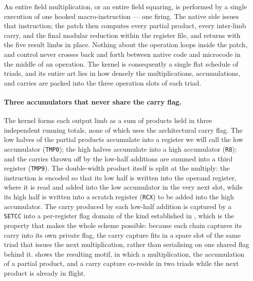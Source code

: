 An entire field multiplication, or an entire field squaring, is performed by a
single execution of one hooked macro-instruction --- one firing. The native side
issues that instruction; the patch then computes every partial product, every
inter-limb carry, and the final modular reduction within the register file, and
returns with the five result limbs in place. Nothing about the operation loops
inside the patch, and control never crosses back and forth between native code
and microcode in the middle of an operation. The kernel is consequently a single
flat schedule of triads, and its entire art lies in how densely the
multiplications, accumulations, and carries are packed into the three operation
slots of each triad.

\paragraph{Three accumulators that never share the carry flag.}
The kernel forms each output limb as a sum of products held in three independent
running totals, none of which uses the architectural carry flag. The low halves
of the partial products accumulate into a register we will call the low
accumulator (\texttt{TMP0}); the high halves accumulate into a high accumulator
(\texttt{R8}); and the carries thrown off by the low-half additions are summed
into a third register (\texttt{TMP9}). The double-width product itself is split
at the multiply: the instruction is encoded so that its low half is written into
the operand register, where it is read and added into the low accumulator in the
very next slot, while its high half is written into a scratch register
(\texttt{RCX}) to be added into the high accumulator. The carry produced by each
low-half addition is captured by a \texttt{SETCC} into a per-register flag domain
of the kind established in , which is the property that makes
the whole scheme possible: because each chain captures its carry into its own
private flag, the carry capture fits in a spare slot of the same triad that
issues the next multiplication, rather than serialising on one shared flag behind
it.  shows the resulting motif, in which a multiplication,
the accumulation of a partial product, and a carry capture co-reside in two
triads while the next product is already in flight.

